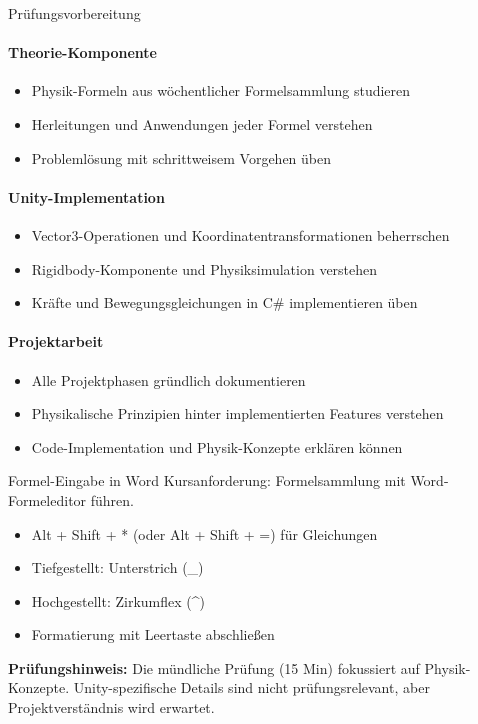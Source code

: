 \begin{KR}{Prüfungsvorbereitung}
    \paragraph{Theorie-Komponente}
    \begin{itemize}
        \item Physik-Formeln aus wöchentlicher Formelsammlung studieren
        \item Herleitungen und Anwendungen jeder Formel verstehen
        \item Problemlösung mit schrittweisem Vorgehen üben
    \end{itemize}
    
    \paragraph{Unity-Implementation}
    \begin{itemize}
        \item Vector3-Operationen und Koordinatentransformationen beherrschen
        \item Rigidbody-Komponente und Physiksimulation verstehen
        \item Kräfte und Bewegungsgleichungen in C\# implementieren üben
    \end{itemize}
    
    \paragraph{Projektarbeit}
    \begin{itemize}
        \item Alle Projektphasen gründlich dokumentieren
        \item Physikalische Prinzipien hinter implementierten Features verstehen
        \item Code-Implementation und Physik-Konzepte erklären können
    \end{itemize}
\end{KR}

\begin{example2}{Formel-Eingabe in Word}
    Kursanforderung: Formelsammlung mit Word-Formeleditor führen.
    \tcblower
    \begin{itemize}
        \item Alt + Shift + * (oder Alt + Shift + =) für Gleichungen
        \item Tiefgestellt: Unterstrich (\_)
        \item Hochgestellt: Zirkumflex (\^{})
        \item Formatierung mit Leertaste abschließen
    \end{itemize}
\end{example2}

\begin{remark}
    \textbf{Prüfungshinweis:} Die mündliche Prüfung (15 Min) fokussiert auf Physik-Konzepte. Unity-spezifische Details sind nicht prüfungsrelevant, aber Projektverständnis wird erwartet.
\end{remark}